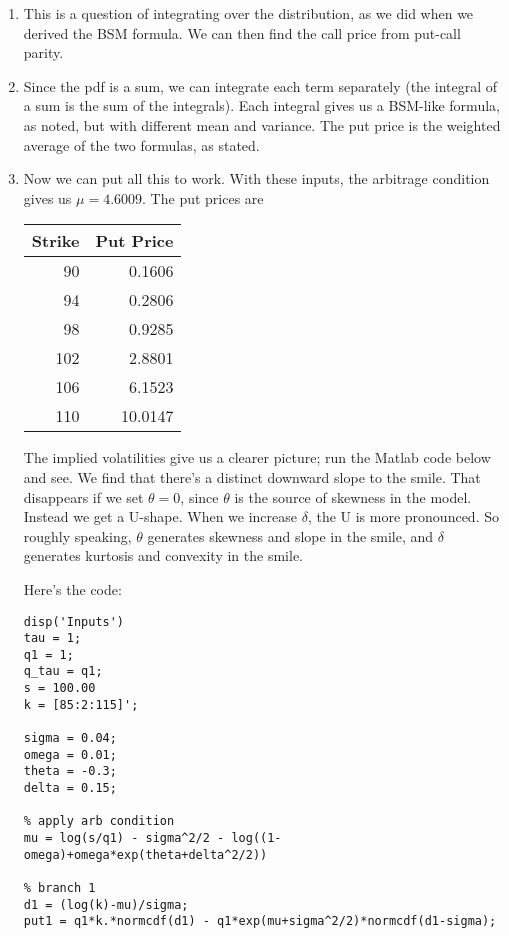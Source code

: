 \documentclass[11pt]{article}
\begin{document}
\begin{enumerate}
\begin{enumerate}
\item This is a question of integrating over the distribution,
as we did when we derived the BSM formula.
We can then find the call price from put-call parity.

\item Since the pdf is a sum, we can integrate
each term separately (the integral of a sum is the sum of the integrals).
Each integral gives us a BSM-like formula, as noted,
but with different mean and variance.
The put price is the weighted average of the two formulas, as stated.

\item Now we can put all this to work.
With these inputs, the arbitrage condition gives us $ \mu = 4.6009$.
The put prices are

\begin{center}
\tabcolsep=0.15in
\begin{tabular}{rr}
\toprule
Strike    &  Put Price  \\
\midrule
  90   & 0.1606   \\
   94  &  0.2806  \\
   98  &  0.9285  \\
  102  &  2.8801  \\
  106  &  6.1523  \\
  110  & 10.0147 \\
\bottomrule
\end{tabular}
\end{center}

The implied volatilities give us a clearer picture;
run the Matlab code below and see.
We find that there's a distinct downward slope to the smile.
That disappears if we set $\theta = 0$, since $\theta$ is the source
of skewness in the model.
Instead we get a U-shape.
When we increase $\delta$, the U is more pronounced.
So roughly speaking, $\theta$ generates skewness and slope
in the smile,
and $\delta$ generates kurtosis and convexity in the smile.

Here's the code:
{\small
\begin{verbatim}
disp('Inputs')
tau = 1;
q1 = 1;
q_tau = q1;
s = 100.00
k = [85:2:115]';

sigma = 0.04;
omega = 0.01;
theta = -0.3;
delta = 0.15;

% apply arb condition
mu = log(s/q1) - sigma^2/2 - log((1-omega)+omega*exp(theta+delta^2/2))

% branch 1
d1 = (log(k)-mu)/sigma;
put1 = q1*k.*normcdf(d1) - q1*exp(mu+sigma^2/2)*normcdf(d1-sigma);


\end{verbatim}}
\end{enumerate}
\end{enumerate}
\end{document}
